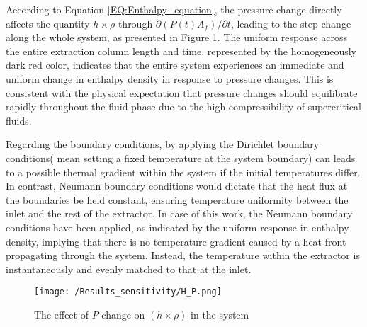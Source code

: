 \documentclass[../Article_Sensitivity_Analsysis.tex]{subfiles}
\begin{document}
    According to Equation \ref{EQ:Enthalpy_equation}, the pressure change directly affects the quantity $h \times \rho$ through $\partial (P(t) A_f) / \partial t$, leading to the step change along the whole system, as presented in Figure \ref{fig:Sensitivty_P_H}. The uniform response across the entire extraction column length and time, represented by the homogeneously dark red color, indicates that the entire system experiences an immediate and uniform change in enthalpy density in response to pressure changes. This is consistent with the physical expectation that pressure changes should equilibrate rapidly throughout the fluid phase due to the high compressibility of supercritical fluids.
    
    Regarding the boundary conditions, by applying the Dirichlet boundary conditions( mean setting a fixed temperature at the system boundary) can leads to a possible thermal gradient within the system if the initial temperatures differ. In contrast, Neumann boundary conditions would dictate that the heat flux at the boundaries be held constant, ensuring temperature uniformity between the inlet and the rest of the extractor. In case of this work, the Neumann boundary conditions have been applied, as indicated by the uniform response in enthalpy density, implying that there is no temperature gradient caused by a heat front propagating through the system. Instead, the temperature within the extractor is instantaneously and evenly matched to that at the inlet.
    
    
    \begin{figure}[h!]
    	\centering
    	\texttt{[image: /Results\_sensitivity/H\_P.png]}
    	\caption{The effect of $P$ change on $(h \times \rho)$ in the system}
    	\label{fig:Sensitivty_P_H}
    \end{figure}
    
\end{document}
